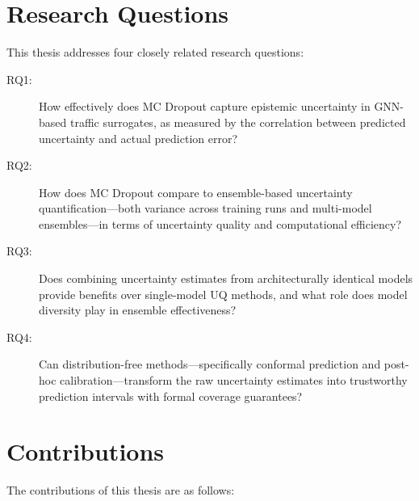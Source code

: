 \section{Research Questions}

This thesis addresses four closely related research questions:

\begin{description}
    \item[RQ1:] How effectively does MC Dropout capture epistemic uncertainty in GNN-based traffic surrogates, as measured by the correlation between predicted uncertainty and actual prediction error?
    
    \item[RQ2:] How does MC Dropout compare to ensemble-based uncertainty quantification---both variance across training runs and multi-model ensembles---in terms of uncertainty quality and computational efficiency?
    
    \item[RQ3:] Does combining uncertainty estimates from architecturally identical models provide benefits over single-model UQ methods, and what role does model diversity play in ensemble effectiveness?
    
    \item[RQ4:] Can distribution-free methods---specifically conformal prediction and post-hoc calibration---transform the raw uncertainty estimates into trustworthy prediction intervals with formal coverage guarantees?
\end{description}

\section{Contributions}

The contributions of this thesis are as follows:

